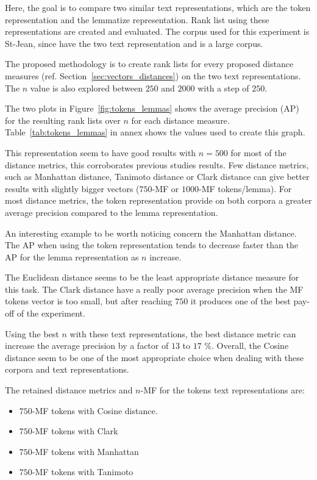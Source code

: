 Here, the goal is to compare two similar text representations, which are the token representation and the lemmatize representation.
Rank list using these representations are created and evaluated.
The corpus used for this experiment is St-Jean, since have the two text representation and is a large corpus.

The proposed methodology is to create rank lists for every proposed distance measures (ref. Section~\ref{sec:vectors_distances}) on the two text representations.
The $n$ value is also explored between $250$ and $2000$ with a step of $250$.

The two plots in Figure~\ref{fig:tokens_lemmas} shows the average precision (AP) for the resulting rank lists over $n$ for each distance measure.
Table~\ref{tab:tokens_lemmas} in annex shows the values used to create this graph.

This representation seem to have good results with $n=500$ for most of the distance metrics, this corroborates previous studies results.
Few distance metrics, such as Manhattan distance, Tanimoto distance or Clark distance can give better results with slightly bigger vectors ($750$-MF or $1000$-MF tokens/lemma).
For most distance metrics, the token representation provide on both corpora a greater average precision compared to the lemma representation.

An interesting example to be worth noticing concern the Manhattan distance.
The AP when using the token representation tends to decrease faster than the AP for the lemma representation as $n$ increase.

The Euclidean distance seems to be the least appropriate distance measure for this task.
The Clark distance have a really poor average precision when the MF tokens vector is too small, but after reaching $750$ it produces one of the best pay-off of the experiment.

Using the best $n$ with these text representations, the best distance metric can increase the average precision by a factor of $13$ to $17$ \%.
Overall, the Cosine distance seem to be one of the most appropriate choice when dealing with these corpora and text representations.

The retained distance metrics and $n$-MF for the tokens text representations are:
\begin{itemize}
  \item $750$-MF tokens with Cosine distance.
  \item $750$-MF tokens with Clark
  \item $750$-MF tokens with Manhattan
  \item $750$-MF tokens with Tanimoto
\end{itemize}

